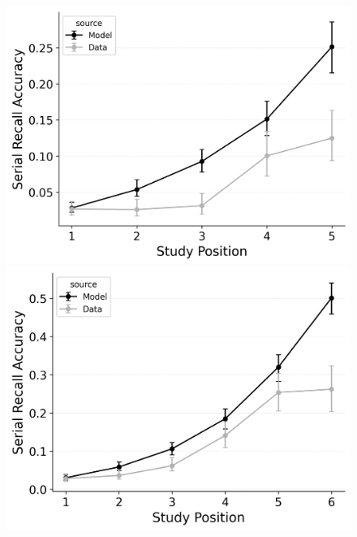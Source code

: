 \documentclass[
  man,
  floatsintext,
  longtable,
  nolmodern,
  notxfonts,
  notimes,
  draftfirst,
  colorlinks=true,linkcolor=blue,citecolor=blue,urlcolor=blue]{apa7}
\begin{document}
\begin{figure}
\begin{minipage}{0.33\linewidth}
\includegraphics{figures/bw_Gordon2021_CRU_with_Pre-Expt_and_Primacy_Confusable_Fitting_omission_error_rate_LL5.png}\end{minipage}%
%
\begin{minipage}{0.33\linewidth}
\includegraphics{figures/bw_Gordon2021_CRU_with_Pre-Expt_and_Primacy_Confusable_Fitting_omission_error_rate_LL6.png}\end{minipage}%
%
\begin{minipage}{0.33\linewidth}

\end{minipage}
\end{figure}
\end{document}
